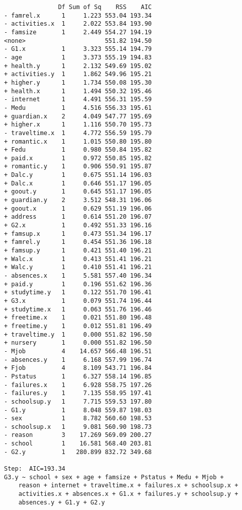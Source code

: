 \documentclass[11pt]{article}
\begin{document}
\begin{enumerate}
\begin{verbatim}
               Df Sum of Sq    RSS    AIC
- famrel.x      1     1.223 553.04 193.34
- activities.x  1     2.022 553.84 193.90
- famsize       1     2.449 554.27 194.19
<none>                      551.82 194.50
- G1.x          1     3.323 555.14 194.79
- age           1     3.373 555.19 194.83
+ health.y      1     2.132 549.69 195.02
+ activities.y  1     1.862 549.96 195.21
+ higher.y      1     1.734 550.08 195.30
+ health.x      1     1.494 550.32 195.46
- internet      1     4.491 556.31 195.59
- Medu          1     4.516 556.33 195.61
+ guardian.x    2     4.049 547.77 195.69
+ higher.x      1     1.116 550.70 195.73
- traveltime.x  1     4.772 556.59 195.79
+ romantic.x    1     1.015 550.80 195.80
+ Fedu          1     0.980 550.84 195.82
+ paid.x        1     0.972 550.85 195.82
+ romantic.y    1     0.906 550.91 195.87
+ Dalc.y        1     0.675 551.14 196.03
+ Dalc.x        1     0.646 551.17 196.05
+ goout.y       1     0.645 551.17 196.05
+ guardian.y    2     3.512 548.31 196.06
+ goout.x       1     0.629 551.19 196.06
+ address       1     0.614 551.20 196.07
+ G2.x          1     0.492 551.33 196.16
+ famsup.x      1     0.473 551.34 196.17
+ famrel.y      1     0.454 551.36 196.18
+ famsup.y      1     0.421 551.40 196.21
+ Walc.x        1     0.413 551.41 196.21
+ Walc.y        1     0.410 551.41 196.21
- absences.x    1     5.581 557.40 196.34
+ paid.y        1     0.196 551.62 196.36
+ studytime.y   1     0.122 551.70 196.41
+ G3.x          1     0.079 551.74 196.44
+ studytime.x   1     0.063 551.76 196.46
+ freetime.x    1     0.021 551.80 196.48
+ freetime.y    1     0.012 551.81 196.49
+ traveltime.y  1     0.000 551.82 196.50
+ nursery       1     0.000 551.82 196.50
- Mjob          4    14.657 566.48 196.51
- absences.y    1     6.168 557.99 196.74
+ Fjob          4     8.109 543.71 196.84
- Pstatus       1     6.327 558.14 196.85
- failures.x    1     6.928 558.75 197.26
- failures.y    1     7.135 558.95 197.41
- schoolsup.y   1     7.715 559.53 197.80
- G1.y          1     8.048 559.87 198.03
- sex           1     8.782 560.60 198.53
- schoolsup.x   1     9.081 560.90 198.73
- reason        3    17.269 569.09 200.27
- school        1    16.581 568.40 203.81
- G2.y          1   280.899 832.72 349.68

Step:  AIC=193.34
G3.y ~ school + sex + age + famsize + Pstatus + Medu + Mjob + 
    reason + internet + traveltime.x + failures.x + schoolsup.x + 
    activities.x + absences.x + G1.x + failures.y + schoolsup.y + 
    absences.y + G1.y + G2.y


\end{verbatim}
\end{enumerate}
\end{document}

